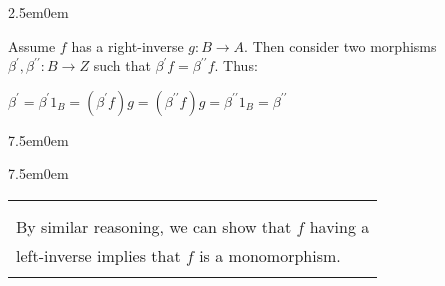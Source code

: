 \documentclass{book}
\newcommand{\pracTwo}{
   \color{Orange}%
   \fontsize{12}{14}\selectfont%
}
\newenvironment{myIndent}{%
   \begin{adjustwidth}{2.5em}{0em}%
}{%
   \end{adjustwidth}%
}
\newenvironment{myTindent}{%
   \begin{adjustwidth}{7.5em}{0em}%
}{%
   \end{adjustwidth}%
}
\newcommand{\pprime}{{\prime\prime}}
\newenvironment{myClosureOne}[2][.]{%
   \color{#1}%
   \begin{tabular}{|p{#2in}|} \hline \\%
}{%
   \\ \hline \end{tabular}%
}
\newcommand{\retTwo}{\hfill\bigbreak}
\begin{document}
{\begin{myIndent} \pracTwo
   Assume $f$ has a right-inverse $g: B \longrightarrow A$. Then consider two morphisms\\ $\beta^\prime, \beta^\pprime: B \longrightarrow Z$ such that $\beta^\prime f = \beta^\pprime f$. Thus:

   {\center $ \beta^\prime = \beta^\prime1_B = (\beta^\prime f) g = (\beta^\pprime f) g = \beta^\pprime 1_B = \beta^\pprime$ \retTwo\par}

   
   \begin{myTindent}\begin{myTindent}
      \begin{myClosureOne}{3.35}
         \\ [-22pt] By similar reasoning, we can show that $f$ having a\\ left-inverse implies that $f$ is a monomorphism.\\ [-10pt]
      \end{myClosureOne}
   \end{myTindent}\end{myTindent}
\end{myIndent}}
\end{document}
